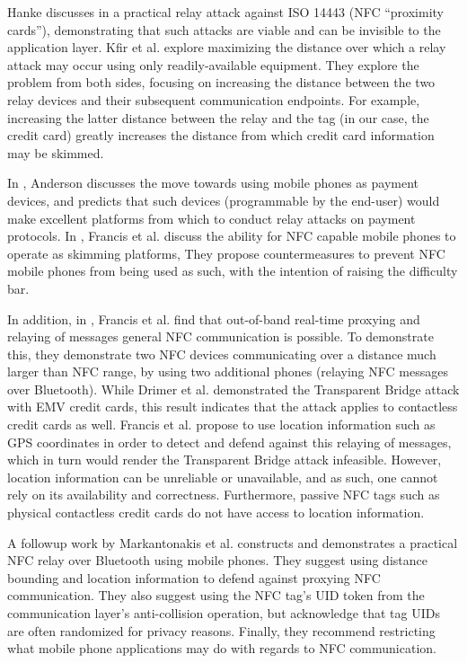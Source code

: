 Hanke discusses in \cite{hancke2005practical} a practical relay attack against ISO 14443 (NFC ``proximity cards''),
    demonstrating that such attacks are viable and can be invisible to the application layer.
Kfir et al. \cite{kfir2005picking} explore maximizing the distance over which a relay attack may occur using only readily-available equipment.
    They explore the problem from both sides, focusing on increasing the distance between the two relay devices and their subsequent communication endpoints.
    For example, increasing the latter distance between the relay and the tag (in our case, the credit card) greatly increases the distance from which credit card information may be skimmed.

In \cite{anderson2007position}, Anderson discusses the move towards using mobile phones as payment devices,
    and predicts that such devices (programmable by the end-user) would make excellent platforms from which to conduct relay attacks on payment protocols.
In \cite{francis2010security}, Francis et al. discuss the ability for NFC capable mobile phones to operate as skimming platforms,
They propose countermeasures to prevent NFC mobile phones from being used as such, with the intention of raising the difficulty bar.

In addition, in \cite{francis2010practical}, Francis et al. find that out-of-band real-time proxying and relaying of messages general NFC communication is possible.
To demonstrate this, they demonstrate two NFC devices communicating over a distance much larger than NFC range,
    by using two additional phones (relaying NFC messages over Bluetooth).
While Drimer et al. demonstrated the Transparent Bridge attack with EMV credit cards,
    this result indicates that the attack applies to contactless credit cards as well.
Francis et al. propose to use location information such as GPS coordinates in order to detect and defend against this relaying of messages,
    which in turn would render the Transparent Bridge attack infeasible.
However, location information can be unreliable or unavailable, and as such, one cannot rely on its availability and correctness.
Furthermore, passive NFC tags such as physical contactless credit cards do not have access to location information.

A followup work by Markantonakis et al. \cite{markantonakis2012practical} constructs and demonstrates a practical NFC relay over Bluetooth using mobile phones.
They suggest using distance bounding and location information to defend against proxying NFC communication.
They also suggest using the NFC tag's UID token from the communication layer's anti-collision operation, but acknowledge that tag UIDs are often randomized for privacy reasons.
Finally, they recommend restricting what mobile phone applications may do with regards to NFC communication.

